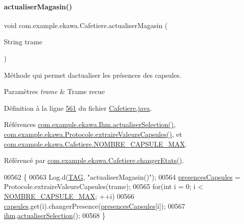 \paragraph{\texorpdfstring{actualiser\+Magasin()}{actualiserMagasin()}}
{\footnotesize\ttfamily void com.\+example.\+ekawa.\+Cafetiere.\+actualiser\+Magasin (\begin{DoxyParamCaption}\item[{String}]{trame }\end{DoxyParamCaption})\hspace{0.3cm}{\ttfamily [private]}}



Méthode qui permet d\textquotesingle{}actualiser les présences des capsules. 


\begin{DoxyParams}{Paramètres}
{\em trame} & Trame recue \\
\hline
\end{DoxyParams}


Définition à la ligne \hyperlink{_cafetiere_8java_source_l00561}{561} du fichier \hyperlink{_cafetiere_8java_source}{Cafetiere.\+java}.



Références \hyperlink{_ihm_8java_source_l00892}{com.\+example.\+ekawa.\+Ihm.\+actualiser\+Selection()}, \hyperlink{_protocole_8java_source_l00319}{com.\+example.\+ekawa.\+Protocole.\+extraire\+Valeurs\+Capsules()}, et \hyperlink{_cafetiere_8java_source_l00029}{com.\+example.\+ekawa.\+Cafetiere.\+N\+O\+M\+B\+R\+E\+\_\+\+C\+A\+P\+S\+U\+L\+E\+\_\+\+M\+AX}.



Référencé par \hyperlink{_cafetiere_8java_source_l00463}{com.\+example.\+ekawa.\+Cafetiere.\+changer\+Etats()}.


\begin{DoxyCode}
00562     \{
00563         Log.d(\hyperlink{classcom_1_1example_1_1ekawa_1_1_cafetiere_aa0c1fd99a2508b06c462aea17034aa91}{TAG}, \textcolor{stringliteral}{"actualiserMagasin()"});
00564         \hyperlink{classcom_1_1example_1_1ekawa_1_1_cafetiere_aebaaf300362a258e047ae31b7e56e622}{presencesCapsules} = Protocole.extraireValeursCapsules(trame);
00565         \textcolor{keywordflow}{for}(\textcolor{keywordtype}{int} i = 0; i < \hyperlink{classcom_1_1example_1_1ekawa_1_1_cafetiere_a183d96e89c056c4ac9c565bf8f24851e}{NOMBRE\_CAPSULE\_MAX}; ++i)
00566             \hyperlink{classcom_1_1example_1_1ekawa_1_1_cafetiere_ae9590789503a6ae2094c86cf93299821}{capsules}.get(i).changerPresence(\hyperlink{classcom_1_1example_1_1ekawa_1_1_cafetiere_aebaaf300362a258e047ae31b7e56e622}{presencesCapsules}[i]);
00567         \hyperlink{classcom_1_1example_1_1ekawa_1_1_cafetiere_a7db4a63088834eda5f6a3e951611bf82}{ihm}.\hyperlink{classcom_1_1example_1_1ekawa_1_1_ihm_a2d7fd2fe397785acc2b9a32e65cfd52f}{actualiserSelection}();
00568     \}
\end{DoxyCode}
\mbox{\label{classcom_1_1example_1_1ekawa_1_1_cafetiere_afa405dc114a82fe74c06ff0971fa6cfc}} 

